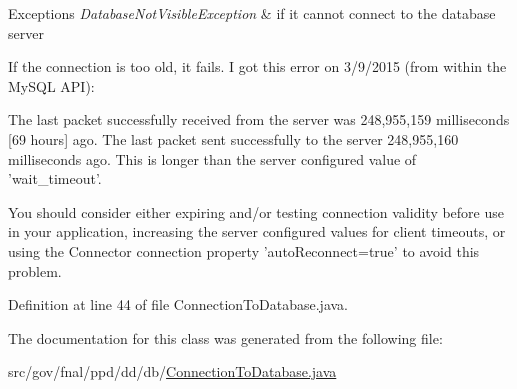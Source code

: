 \begin{DoxyExceptions}{Exceptions}
{\em Database\-Not\-Visible\-Exception} & if it cannot connect to the database server \\
\hline
\end{DoxyExceptions}
If the connection is too old, it fails. I got this error on 3/9/2015 (from within the My\-S\-Q\-L A\-P\-I)\-:


\begin{DoxyPre}
The last packet successfully received from the server was 248,955,159 milliseconds [69 hours] ago. 
The last packet sent successfully to the server 248,955,160 milliseconds ago. 
This is longer than the server configured value of 'wait\_timeout'.\end{DoxyPre}



\begin{DoxyPre}You should consider either expiring and/or testing connection validity before use in your application,
increasing the server configured values for client timeouts, or using the Connector connection property
'autoReconnect=true' to avoid this problem.
\end{DoxyPre}


Definition at line 44 of file Connection\-To\-Database.\-java.



The documentation for this class was generated from the following file\-:\begin{DoxyCompactItemize}
\item 
src/gov/fnal/ppd/dd/db/\hyperlink{ConnectionToDatabase_8java}{Connection\-To\-Database.\-java}\end{DoxyCompactItemize}
